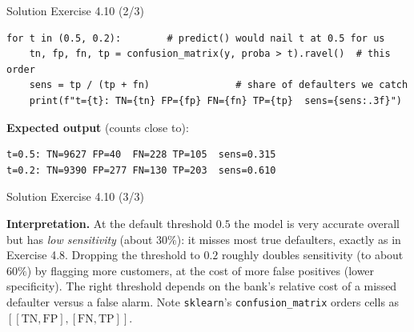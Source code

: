 \documentclass[aspectratio=169,11pt]{beamer}
\begin{document}
\begin{frame}[fragile]{Solution \textemdash{} Exercise 4.10 (2/3)}
\begin{solutionbox}
\begin{lstlisting}
for t in (0.5, 0.2):        # predict() would nail t at 0.5 for us
    tn, fp, fn, tp = confusion_matrix(y, proba > t).ravel()  # this order
    sens = tp / (tp + fn)               # share of defaulters we catch
    print(f"t={t}: TN={tn} FP={fp} FN={fn} TP={tp}  sens={sens:.3f}")
\end{lstlisting}

\textbf{Expected output} (counts close to):
\begin{lstlisting}
t=0.5: TN=9627 FP=40  FN=228 TP=105  sens=0.315
t=0.2: TN=9390 FP=277 FN=130 TP=203  sens=0.610
\end{lstlisting}
\end{solutionbox}
\end{frame}

\begin{frame}[fragile]{Solution \textemdash{} Exercise 4.10 (3/3)}
\begin{solutionbox}
\textbf{Interpretation.} At the default threshold $0.5$ the model is
very accurate overall but has \emph{low sensitivity} (about $30\%$): it
misses most true defaulters, exactly as in Exercise 4.8. Dropping the threshold
to $0.2$ roughly doubles sensitivity (to about $60\%$) by flagging more
customers, at the cost of more false positives (lower specificity). The
right threshold depends on the bank's relative cost of a missed
defaulter versus a false alarm. Note \texttt{sklearn}'s
\texttt{confusion\_matrix} orders cells as
$[[\mathrm{TN},\mathrm{FP}],[\mathrm{FN},\mathrm{TP}]]$.
\end{solutionbox}
\end{frame}
\end{document}
